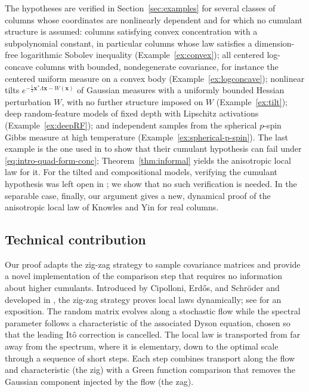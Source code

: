\documentclass[11pt,reqno]{amsart}
\def\x{\mathbf{x}}
\theoremstyle{definition}
\numberwithin{equation}{section}
\numberwithin{figure}{section}
\begin{document}
The hypotheses are verified in Section~\ref{sec:examples} for several classes of columns whose coordinates are nonlinearly dependent and for which no cumulant structure is assumed: columns satisfying convex concentration with a subpolynomial constant, in particular columns whose law satisfies a dimension-free logarithmic Sobolev inequality (Example~\ref{ex:convex}); all centered log-concave columns with bounded, nondegenerate covariance, for instance the centered uniform measure on a convex body (Example~\ref{ex:logconcave}); nonlinear tilts $e^{-\frac12\x^*\Lambda\x-W(\x)}$ of Gaussian measures with a uniformly bounded Hessian perturbation $W$, with no further structure imposed on $W$ (Example~\ref{ex:tilt}); deep random-feature models of fixed depth with Lipschitz activations (Example~\ref{ex:deepRF}); and independent samples from the spherical $p$-spin Gibbs measure at high temperature (Example~\ref{ex:spherical-p-spin}). The last example is the one used in \cite{fan2026anisotropic} to show that their cumulant hypothesis can fail under \eqref{eq:intro-quad-form-conc}; Theorem~\ref{thm:informal} yields the anisotropic local law for it. For the tilted and compositional models, verifying the cumulant hypothesis was left open in \cite{fan2026anisotropic}; we show that no such verification is needed. In the separable case, finally, our argument gives a new, dynamical proof of the anisotropic local law of Knowles and Yin \cite{knowles2017anisotropic} for real columns.


\subsection{Technical contribution}\label{sec:technical-contribution}

Our proof adapts the zig-zag strategy to sample covariance matrices and provide a novel implementation of the comparison step that requires no information about higher cumulants. Introduced by Cipolloni, Erd\H{o}s, and Schr\"oder \cite{cipolloni2022mesoscopic} and developed in \cite{cipolloni2023edge,cipolloni2024out,erdos2024eigenstate,erdos2025zigzag}, the zig-zag strategy proves local laws dynamically; see \cite{erdos2025lecture} for an exposition. The random matrix evolves along a stochastic flow while the spectral parameter follows a characteristic of the associated Dyson equation, chosen so that the leading It\^o correction is cancelled. The local law is transported from far away from the spectrum, where it is elementary, down to the optimal scale through a sequence of short steps. Each step combines transport along the flow and characteristic (the zig) with a Green function comparison that removes the Gaussian component injected by the flow (the zag).
\end{document}
